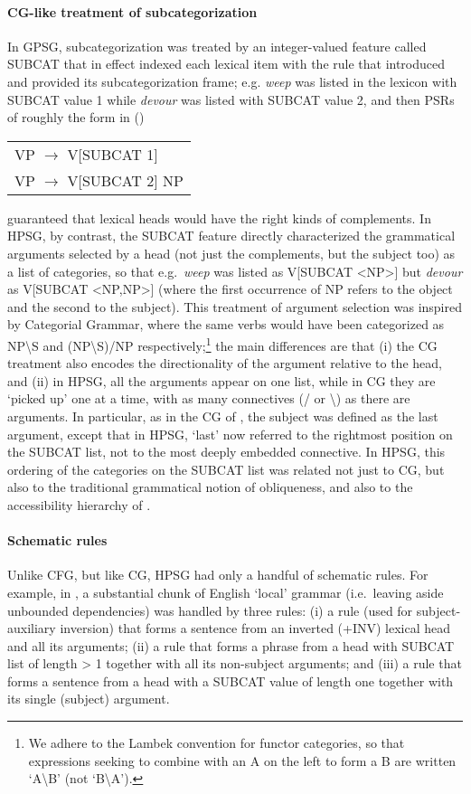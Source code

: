\documentclass[output=paper]{langsci/langscibook}
\begin{document}
\paragraph*{CG-like treatment of subcategorization} In GPSG, subcategorization was treated by an integer-valued feature called SUBCAT that in effect indexed each lexical item with the rule that introduced and provided its subcategorization frame; e.g. \emph{weep} was listed in the lexicon with SUBCAT value 1 while \emph{devour} was listed with SUBCAT value 2, and then PSRs of roughly the form in ()
\ea
\begin{tabular}{l}
          VP $\rightarrow$ V[SUBCAT 1] \\
          VP $\rightarrow$ V[SUBCAT 2] NP
\end{tabular}
\z

\noindent
guaranteed that lexical heads would have the right kinds of complements.  In HPSG, by contrast, the SUBCAT feature directly characterized the grammatical arguments selected by a head (not just the complements, but the subject too) as a list of categories, so that e.g.~\emph{weep} was listed as V[SUBCAT <NP>] but \emph{devour} as V[SUBCAT <NP,NP>] (where the first occurrence of NP refers to the object and the second to the subject). This treatment of argument selection was inspired by Categorial Grammar, where the same verbs would have been categorized as NP{\textbackslash}S and (NP{\textbackslash}S)/NP respectively;\footnote{We adhere to the Lambek convention for functor categories, so that expressions seeking to combine with an A on the left to form a B are written `A{\textbackslash}B' (not `B{\textbackslash}A').} the main differences are that (i) the CG treatment also encodes the directionality of the argument relative to the head, and (ii) in HPSG, all the arguments appear on one list, while in CG they are `picked up' one at a time, with as many
connectives (/ or \textbackslash) as there are arguments. In particular, as in the CG of \citet{Dowty82b-ohne-crossref}, the subject was defined as the last argument, except that in HPSG, `last' now referred to the rightmost position on the SUBCAT list, not to the most deeply embedded connective. In HPSG, this
ordering of the categories on the SUBCAT list was related not just to CG, but also to the traditional grammatical notion of obliqueness, and also to the accessibility hierarchy of \citet{KC77a}.

\paragraph*{Schematic rules} Unlike CFG, but like CG, HPSG had only a handful of schematic rules. For example, in \citet{Pollard85a-u}, a substantial chunk of English `local' grammar (i.e.~leaving aside unbounded dependencies) was handled by three rules: (i) a rule (used for subject-auxiliary inversion) that forms a sentence from an inverted (+INV) lexical head and all its arguments; (ii) a rule that forms a phrase from a head with SUBCAT list of length > 1 together with all its non-subject arguments; and (iii) a rule that forms a sentence from a head with a SUBCAT value of length one together with its single (subject) argument.
\end{document}
